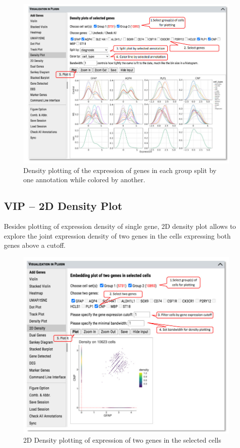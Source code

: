 \documentclass[
]{article}
\begin{document}
\begin{figure}
\centering
\includegraphics{figures/F13.jpg}
\caption{Density plotting of the expression of genes in each group split by one annotation while colored by another.}
\end{figure}

\hypertarget{vip-2d-density-plot}{%
\subsection{VIP -- 2D Density Plot}\label{vip-2d-density-plot}}

Besides plotting of expression density of single gene, 2D density plot allows to explore the joint expression density of two genes in the cells expressing both genes above a cutoff.

\begin{figure}
\centering
\includegraphics{figures/F14.jpg}
\caption{2D Density plotting of expression of two genes in the selected cells}
\end{figure}
\end{document}
